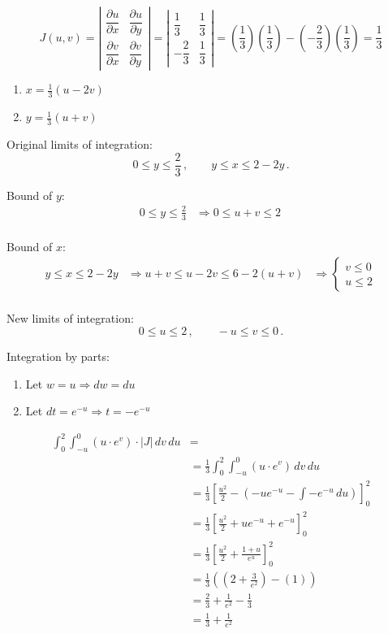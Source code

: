 \documentclass[letter,11pt]{article}
\begin{document}
$$J(u,v) = \left|\begin{matrix} \dfrac{\partial u}{\partial x} & \dfrac{\partial u}{\partial y} \\[1em]\dfrac{\partial v}{\partial x} & \dfrac{\partial v}{\partial y} \end{matrix} \right| = \left| \begin{matrix}
\dfrac{1}{3} & \dfrac{1}{3}\\[1em]
-\dfrac{2}{3} & \dfrac{1}{3}
\end{matrix}\right| = \left(\frac{1}{3}\right)\left(\frac{1}{3}\right)-\left(-\frac{2}{3}\right)\left(\frac{1}{3}\right)=\frac{1}{3}$$

\begin{enumerate}
    \item $x = \frac{1}{3}(u - 2v)$
    \item $y = \frac{1}{3}(u + v)$
\end{enumerate}

Original limits of integration: 
$$0\leq y \leq \frac{2}{3}\,,\qquad y\leq x \leq 2-2y\,.$$

Bound of $y$:
\begin{align*}
0\leq y \leq \frac{2}{3}&\Longrightarrow 0\leq u+v \leq 2\,\\
\end{align*}

Bound of $x$:
\begin{align*}
y\leq x \leq 2-2y &\Longrightarrow u+v\leq u-2v\leq 6-2(u+v) &\Longrightarrow \begin{cases*}v\leq 0\\u\leq2\end{cases*} \\
\end{align*}

New limits of integration:
$$0\leq u\leq 2\,,\qquad-u\leq v\leq0\,.$$

Integration by parts:
\begin{enumerate}
    \item Let $w = u \Longrightarrow dw = du$
    \item Let $dt = e^{-u} \Longrightarrow t = -e^{-u}$
\end{enumerate}

\begin{align*}
    \int_0^2 \int_{-u}^{0} \left(u\cdot e^v\right) \cdot |J| \, dv \, du &= \\
    &= \frac{1}{3} \int_0^2 \int_{-u}^{0} \left(u\cdot e^v\right) \, dv \, du\\
    &= \frac{1}{3}\left[\frac{u^2}{2}-\left(-ue^{-u} -\int -e^{-u} \, du \right)\right]_{0}^{2}\\
    &= \frac{1}{3}\left[\frac{u^2}{2}+ue^{-u} + e^{-u}\right]_{0}^{2}\\
    &= \frac{1}{3}\left[\frac{u^2}{2}+\frac{1+u}{e^{u}}\right]_{0}^{2}\\
    &= \frac{1}{3}\left(\left(2+\frac{3}{e^{2}}\right)-\left(1\right)\right)\\
    &= \frac{2}{3}+\frac{1}{e^{2}}-\frac{1}{3}\\
    &= \boxed{\frac{1}{3}+\frac{1}{e^{2}}}
\end{align*}
\end{document}
